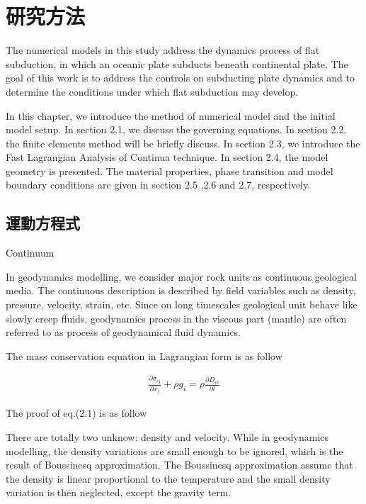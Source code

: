 
\chapter{研究方法}

The numerical models in this study address the dynamics process of flat subduction, in which an oceanic plate subducts beneath continental plate. The goal of this work is to address the controls on subducting plate dynamics and 
to determine the conditions under which flat subduction may develop. 

In this chapter, we introduce the method of numerical model and the initial model setup. In section 2.1, we discuss the governing equations. In section 2.2, the finite elements method will be briefly discuss. In section 2.3, we introduce the Fast Lagrangian Analysis of Continua technique. In section 2.4, the model geometry is presented. The material properties, phase transition and model boundary conditions are given in section 2.5 ,2.6 and 2.7, respectively.

\section{運動方程式}

Continuum

In geodynamics modelling, we consider major rock units as continuous geological media. The continuous description is described by field variables such as density, pressure, velocity, strain, etc. Since on long timescales geological unit behave like slowly creep fluids, geodynamics process in the viscous part (mantle) are often referred to as process of geodynamical fluid dynamics. 

The mass conservation equation in Lagrangian form is as follow

\begin{align}
\frac{\partial \sigma_{ij}}{\partial x_j}+\rho g_i = \rho \frac{\partial D_{vi}}{\partial t} 
\end{align}

The proof of eq.(2.1) is as follow



There are totally two unknow: density and velocity.
While in geodynamics modelling, the density variations are small enough to be ignored, which is the result of Boussinesq approximation. The Boussinesq approximation assume that the density is linear proportional to the temperature and the small density variation is then neglected, except the gravity term.

